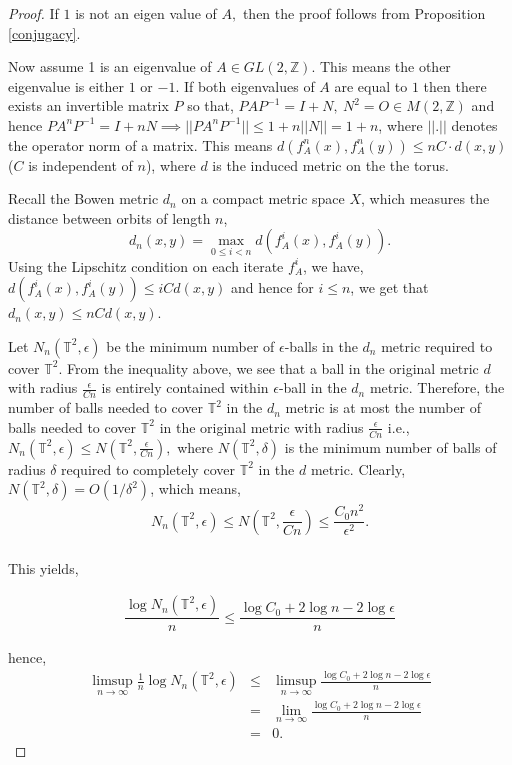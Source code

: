 \documentclass[10pt,a4paper]{amsart}
\begin{document}
\begin{proof}
If $1$ is not an eigen value of $A,$ then the proof follows from Proposition \ref{conjugacy}.    

Now assume 1 is an eigenvalue of $A \in GL(2,\mathbb{Z})$. This means the other eigenvalue is either $1$ or $-1$. If both eigenvalues of $A$ are equal to $1$ then there exists an invertible matrix $P$ so that, $PAP^{-1}=I+N, ~N^2=O \in M(2, \mathbb Z)$ and hence $PA^nP^{-1}=I+nN \implies ||PA^nP^{-1}|| \leq 1+n||N||=1+n$, where $||.||$ denotes the operator norm of a matrix. This means $d(f_A^n(x),f_A^n(y))\leq nC \cdot d(x,y)$ ($C$ is independent of $n$), where $d$ is the induced metric on the the torus.

Recall the Bowen metric $d_n$ on a compact metric space $X$, which measures the distance between orbits of length $n$,  $$d_n(x, y) = \max_{0 \leq i < n} d(f_A^i(x), f_A^i(y)).$$ Using the Lipschitz condition on each iterate $f_A^i$, we have,  $d(f_A^i(x), f_A^i(y))  \leq iC  d(x, y)$ and hence for $i \leq n$, we get that $d_n(x, y) \leq nC  d(x, y)$.

Let $N_n(\mathbb{T}^2, \epsilon)$ be the minimum number of $\epsilon$-balls in the $d_n$ metric required to cover $\mathbb{T}^2$. From the inequality above, we see that a ball in the original metric $d$ with radius $ \frac{\epsilon}{Cn}$ is entirely contained within $\epsilon$-ball in the $d_n$ metric. Therefore, the number of balls needed to cover $\mathbb{T}^2$ in the $d_n$ metric is at most the number of balls needed to cover $\mathbb{T}^2$ in the original metric with radius $\frac{\epsilon}{Cn}$ i.e., $N_n(\mathbb{T}^2, \epsilon) \leq N\left(\mathbb{T}^2, \frac{\epsilon}{Cn}\right),$ where $N(\mathbb{T}^2, \delta)$ is the minimum number of balls of radius $\delta$ required to completely cover   $\mathbb{T}^2$ in the $d$ metric. Clearly, $N(\mathbb{T}^2, \delta)=O(1/\delta^2)$, which means, 
\[
\begin{array}{c}
N_n(\mathbb{T}^2, \epsilon)
\leq N\!\left(\mathbb{T}^2, \dfrac{\epsilon}{Cn}\right)
\leq \dfrac{C_0 n^2}{\epsilon^2}. \\[0.6em]
\end{array}
\]

This yields, 

\[
\begin{array}{c}
\dfrac{\log N_n(\mathbb{T}^2, \epsilon)}{n}
\leq
\dfrac{\log C_0 + 2\log n - 2\log \epsilon}{n}
\end{array}
\]

hence,  
\[
\begin{array}{rcl}
\displaystyle
\limsup_{n \to \infty} \frac{1}{n}\log N_n(\mathbb{T}^2,\epsilon)
& \le &
\displaystyle
\limsup_{n \to \infty} \frac{\log C_0 + 2\log n - 2\log \epsilon}{n} \\[0.8em]
& = &
\displaystyle
\lim_{n \to \infty} \frac{\log C_0 + 2\log n - 2\log \epsilon}{n} \\[0.8em]
& = & 0 .
\end{array}
\]


\end{proof}
\end{document}
